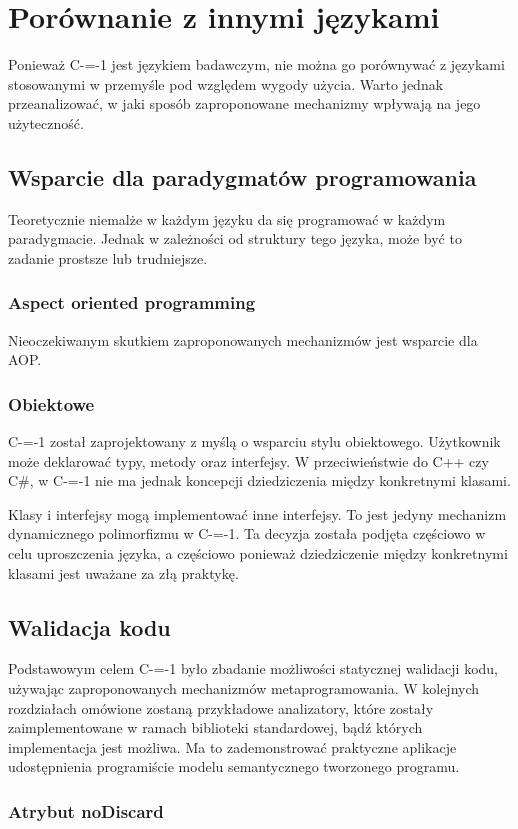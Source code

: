 \section{Porównanie z innymi językami}
Ponieważ C-=-1 jest językiem badawczym, nie można go porównywać z językami stosowanymi w przemyśle pod względem wygody użycia. Warto jednak przeanalizować, w jaki sposób zaproponowane mechanizmy wpływają na jego użyteczność.
\subsection{Wsparcie dla paradygmatów programowania}
Teoretycznie niemalże w każdym języku da się programować w każdym paradygmacie. Jednak w zależności od struktury tego języka, może być to zadanie prostsze lub trudniejsze. 
\subsubsection{Aspect oriented programming}
Nieoczekiwanym skutkiem zaproponowanych mechanizmów jest wsparcie dla AOP.
\subsubsection{Obiektowe}
C-=-1 został zaprojektowany z myślą o wsparciu stylu obiektowego. Użytkownik może deklarować typy, metody oraz interfejsy. W przeciwieństwie do C++ czy C\#, w C-=-1 nie ma jednak koncepcji dziedziczenia między konkretnymi klasami.

Klasy i interfejsy mogą implementować inne interfejsy. To jest jedyny mechanizm dynamicznego polimorfizmu w C-=-1. Ta decyzja została podjęta częściowo w celu uproszczenia języka, a częściowo ponieważ dziedziczenie między konkretnymi klasami jest uważane za złą praktykę.

\subsection{Walidacja kodu}
Podstawowym celem C-=-1 było zbadanie możliwości statycznej walidacji kodu, używając zaproponowanych mechanizmów metaprogramowania.
W kolejnych rozdziałach omówione zostaną przykładowe analizatory, które zostały zaimplementowane w ramach biblioteki standardowej, bądź których implementacja jest możliwa.
Ma to zademonstrować praktyczne aplikacje udostępnienia programiście modelu semantycznego tworzonego programu.



\subsubsection{Atrybut noDiscard}
\label{no_discard}

